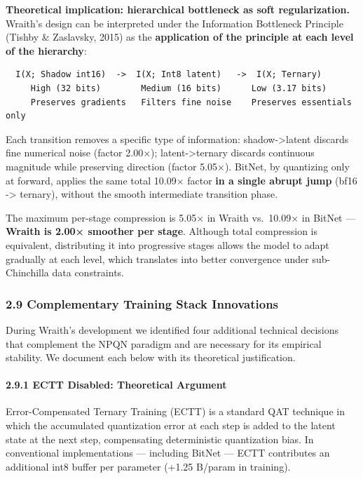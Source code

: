 \textbf{Theoretical implication: hierarchical bottleneck as soft
regularization.} Wraith's design can be interpreted under the
Information Bottleneck Principle (Tishby \& Zaslavsky, 2015) as the
\textbf{application of the principle at each level of the hierarchy}:

\begin{verbatim}
  I(X; Shadow int16)  ->  I(X; Int8 latent)   ->  I(X; Ternary)
     High (32 bits)        Medium (16 bits)      Low (3.17 bits)
     Preserves gradients   Filters fine noise    Preserves essentials only
\end{verbatim}

Each transition removes a specific type of information: shadow->latent
discards fine numerical noise (factor 2.00×); latent->ternary discards
continuous magnitude while preserving direction (factor 5.05×). BitNet,
by quantizing only at forward, applies the same total 10.09× factor
\textbf{in a single abrupt jump} (bf16 -> ternary), without the smooth
intermediate transition phase.

The maximum per-stage compression is 5.05× in Wraith vs.~10.09× in
BitNet --- \textbf{Wraith is 2.00× smoother per stage}. Although total
compression is equivalent, distributing it into progressive stages
allows the model to adapt gradually at each level, which translates into
better convergence under sub-Chinchilla data constraints.

\subsubsection{2.9 Complementary Training Stack
Innovations}\label{complementary-training-stack-innovations}

During Wraith's development we identified four additional technical
decisions that complement the NPQN paradigm and are necessary for its
empirical stability. We document each below with its theoretical
justification.

\paragraph{2.9.1 ECTT Disabled: Theoretical
Argument}\label{ectt-disabled-theoretical-argument}

Error-Compensated Ternary Training (ECTT) is a standard QAT technique in
which the accumulated quantization error at each step is added to the
latent state at the next step, compensating deterministic quantization
bias. In conventional implementations --- including BitNet --- ECTT
contributes an additional int8 buffer per parameter (+1.25 B/param in
training).

